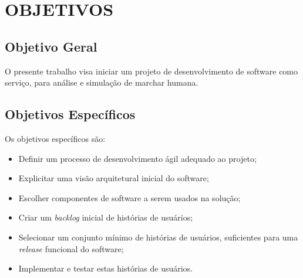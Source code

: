 \section[OBJETIVOS]{OBJETIVOS}

\subsection[Objetivo Geral]{\textbf{Objetivo Geral}}
O presente trabalho visa iniciar um projeto de desenvolvimento de software como serviço, para análise e simulação de marchar humana.

\subsection[Objetivo Específicos]{\textbf{Objetivos Específicos}}
Os objetivos específicos são:
\begin{itemize}
	\item Definir um processo de desenvolvimento ágil adequado ao projeto;
	\item Explicitar uma visão arquitetural inicial do software;
	\item Escolher componentes de software a serem usados na solução;
	\item Criar um \emph{backlog} inicial de histórias de usuários;
	\item Selecionar um conjunto mínimo de histórias de usuários, suficientes para uma \emph{release} funcional do software;
	\item Implementar e testar estas histórias de usuários.
\end{itemize}
